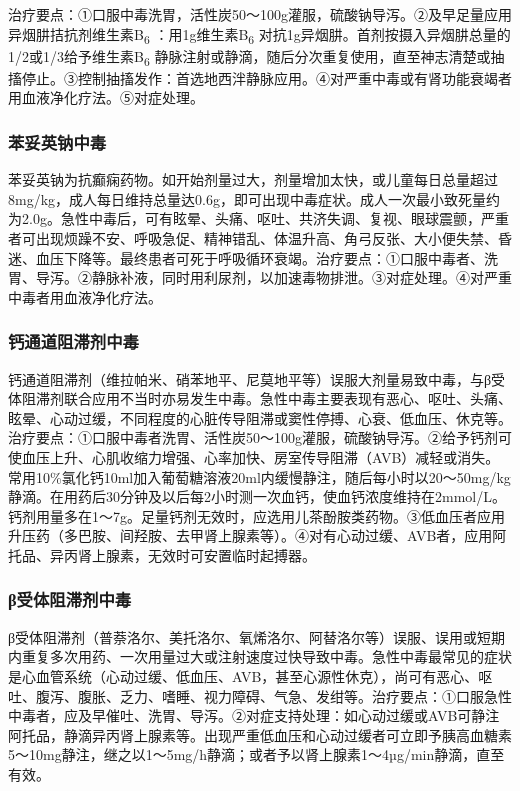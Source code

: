 治疗要点：①口服中毒洗胃，活性炭50～100g灌服，硫酸钠导泻。②及早足量应用异烟肼拮抗剂维生素B\textsubscript{6}
：用1g维生素B\textsubscript{6}
对抗1g异烟肼。首剂按摄入异烟肼总量的1/2或1/3给予维生素B\textsubscript{6}
静脉注射或静滴，随后分次重复使用，直至神志清楚或抽搐停止。③控制抽搐发作：首选地西泮静脉应用。④对严重中毒或有肾功能衰竭者用血液净化疗法。⑤对症处理。

\subsubsection{苯妥英钠中毒}

苯妥英钠为抗癫痫药物。如开始剂量过大，剂量增加太快，或儿童每日总量超过8mg/kg，成人每日维持总量达0.6g，即可出现中毒症状。成人一次最小致死量约为2.0g。急性中毒后，可有眩晕、头痛、呕吐、共济失调、复视、眼球震颤，严重者可出现烦躁不安、呼吸急促、精神错乱、体温升高、角弓反张、大小便失禁、昏迷、血压下降等。最终患者可死于呼吸循环衰竭。治疗要点：①口服中毒者、洗胃、导泻。②静脉补液，同时用利尿剂，以加速毒物排泄。③对症处理。④对严重中毒者用血液净化疗法。

\subsubsection{钙通道阻滞剂中毒}

钙通道阻滞剂（维拉帕米、硝苯地平、尼莫地平等）误服大剂量易致中毒，与β受体阻滞剂联合应用不当时亦易发生中毒。急性中毒主要表现有恶心、呕吐、头痛、眩晕、心动过缓，不同程度的心脏传导阻滞或窦性停搏、心衰、低血压、休克等。治疗要点：①口服中毒者洗胃、活性炭50～100g灌服，硫酸钠导泻。②给予钙剂可使血压上升、心肌收缩力增强、心率加快、房室传导阻滞（AVB）减轻或消失。常用10\%氯化钙10ml加入葡萄糖溶液20ml内缓慢静注，随后每小时以20～50mg/kg静滴。在用药后30分钟及以后每2小时测一次血钙，使血钙浓度维持在2mmol/L。钙剂用量多在1～7g。足量钙剂无效时，应选用儿茶酚胺类药物。③低血压者应用升压药（多巴胺、间羟胺、去甲肾上腺素等）。④对有心动过缓、AVB者，应用阿托品、异丙肾上腺素，无效时可安置临时起搏器。

\subsubsection{β受体阻滞剂中毒}

β受体阻滞剂（普萘洛尔、美托洛尔、氧烯洛尔、阿替洛尔等）误服、误用或短期内重复多次用药、一次用量过大或注射速度过快导致中毒。急性中毒最常见的症状是心血管系统（心动过缓、低血压、AVB，甚至心源性休克），尚可有恶心、呕吐、腹泻、腹胀、乏力、嗜睡、视力障碍、气急、发绀等。治疗要点：①口服急性中毒者，应及早催吐、洗胃、导泻。②对症支持处理：如心动过缓或AVB可静注阿托品，静滴异丙肾上腺素等。出现严重低血压和心动过缓者可立即予胰高血糖素5～10mg静注，继之以1～5mg/h静滴；或者予以肾上腺素1～4µg/min静滴，直至有效。

